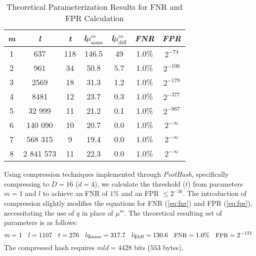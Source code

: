 \begin{table}[htbp] 
    \centering
    \begin{tabular}{|c|c|c|c|c|c|c|}
        \hline
        \textit{m} & \textit{l} & \textit{t} & \textit{l}\(\mu_{\text{same}}^m\) & \textit{l}\(\mu_{\text{diff}}^m\) & \textit{FNR} & \textit{FPR} \\
        \hline
        1 & 637 & 118 & 146.5 & 49 & 1.0\% & \(2^{-74}\) \\
        2 & 961 & 34 & 50.8 & 5.7 & 1.0\% & \(2^{-106}\) \\
        3 & 2569 & 18 & 31.3 & 1.2 & 1.0\% &\(2^{-179}\) \\
        4 & 8481 & 12 & 23.7 & 0.3 & 1.0\% & \(2^{-377}\) \\
        5 & 32 999 & 11 & 21.2 & 0.1 & 1.0\% & \(2^{-967}\) \\
        6 & 140 090 & 10 & 20.7 & 0.0 & 1.0\% & \(2^{-\infty}\) \\
        7 & 568 315 & 9 & 19.4 & 0.0 & 1.0\% & \(2^{-\infty}\) \\
        8 & 2 841 573 & 11 & 22.3 & 0.0 & 1.0\% & \(2^{-\infty}\) \\
        \hline
    \end{tabular}
    \caption{Theoretical Parameterization Results for FNR and FPR Calculation}
    \label{tab:theoretical_parameterization}
\end{table}

Using compression techniques implemented through \textit{PostHash}, specifically compressing to \( D = 16 \) (\( d = 4 \)), we calculate the threshold (\( t \)) from parameters \( m = 1 \) and \( l \) to achieve an FNR of \(1\%\) and an FPR \(\leq 2^{-36} \). The introduction of compression slightly modifies the equations for FNR (\ref{eq:fnr}) and FPR (\ref{eq:fpr}), necessitating the use of \( q \) in place of \(\mu^m\). The theoretical resulting set of parameters is as follows:
\begin{equation}
\small
m = 1 \quad l = 1107 \quad t = 276 \quad lq_{\text{same}} = 317.7 \quad lq_{\text{diff}} = 130.6 \quad \text{FNR} = 1.0\% \quad \text{FPR} = 2^{-121}
\end{equation}
The compressed hash requires \( mld = 4428 \) bits (\( 553 \) bytes).

